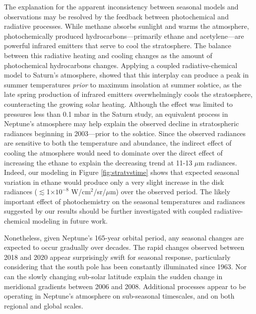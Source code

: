 \documentclass[twocolumn,10pt]{aastex631}
\begin{document}
The explanation for the apparent inconsistency between seasonal models and observations may be resolved by the feedback between photochemical and radiative processes. While methane absorbs sunlight and warms the atmosphere, photochemically produced hydrocarbons---primarily ethane and acetylene---are powerful infrared emitters that serve to cool the stratosphere. The balance between this radiative heating and cooling changes as the amount of photochemical hydrocarbons changes.  Applying a coupled radiative-chemical model to Saturn's atmosphere,  \citet{hue20162d} showed that this interplay can produce a peak in summer temperatures \emph{prior} to maximum insolation at summer solstice, as the late spring production of infrared emitters overwhelmingly cools the stratosphere, counteracting the growing solar heating. Although the effect was limited to pressures less than 0.1 mbar in the Saturn study, an equivalent process in Neptune's atmosphere may help explain the observed decline in stratospheric radiances beginning in 2003---prior to the solstice.  Since the observed radiances are sensitive to both the temperature and abundance, the indirect effect of cooling the atmosphere would need to dominate over the direct effect of increasing the ethane to explain the decreasing trend at 11-13 $\mu$m radiances. Indeed, our modeling in Figure \ref{fig:stratvstime} shows that expected seasonal variation in ethane would produce only a very slight increase in the disk radiances ($\lesssim$1$\times10^{-8}$ W/cm$^2$/sr/$\mu$m) over the observed period.  The likely important effect of photochemistry on the seasonal temperatures and radiances suggested by our results should be further investigated with coupled radiative-chemical modeling in future work.

Nonetheless, given Neptune's 165-year orbital period, any seasonal changes are expected to occur gradually over decades. The rapid changes observed between 2018 and 2020 appear surprisingly swift for seasonal response, particularly considering that the south pole has been constantly illuminated since 1963. Nor can the slowly changing sub-solar latitude explain the sudden change in meridional gradients between 2006 and 2008. Additional processes appear to be operating in Neptune's atmosphere on sub-seasonal timescales, and on both regional and global scales. 
\end{document}
